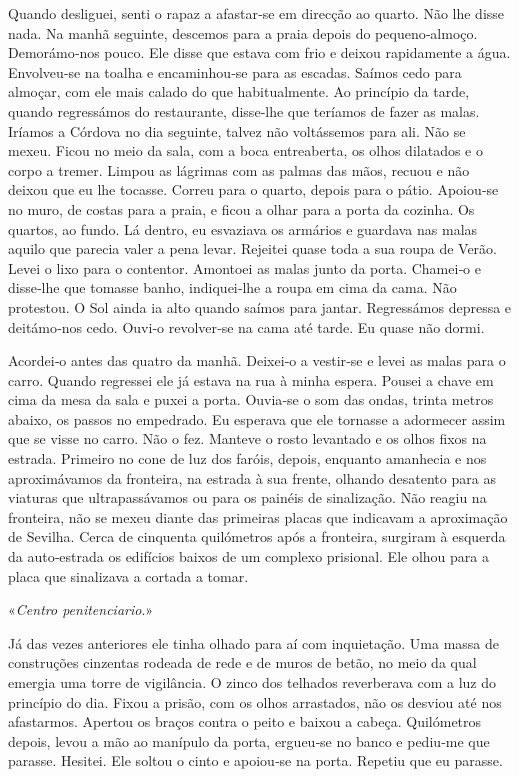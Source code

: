 Quando desliguei, senti o rapaz a afastar­‑se em direcção ao quarto. Não
lhe disse nada. Na manhã seguinte, descemos para a praia depois do
pequeno­‑almoço. Demorámo­‑nos pouco. Ele disse que estava com frio e
deixou rapidamente a água. Envolveu­‑se na toalha e encaminhou­‑se para
as escadas. Saímos cedo para almoçar, com ele mais calado do que
habitualmente. Ao princípio da tarde, quando regressámos do restaurante,
disse­‑lhe que teríamos de fazer as malas. Iríamos a Córdova no dia
seguinte, talvez não voltássemos para ali. Não se mexeu. Ficou no meio
da sala, com a boca entreaberta, os olhos dilatados e o corpo a tremer.
Limpou as lágrimas com as palmas das mãos, recuou e não deixou que eu
lhe tocasse. Correu para o quarto, depois para o pátio. Apoiou­‑se no
muro, de costas para a praia, e ficou a olhar para a porta da cozinha.
Os quartos, ao fundo. Lá dentro, eu esvaziava os armários e guardava nas
malas aquilo que parecia valer a pena levar. Rejeitei quase toda a sua
roupa de Verão. Levei o lixo para o contentor. Amontoei as malas junto
da porta. Chamei­‑o e disse­‑lhe que tomasse banho, indiquei­‑lhe a
roupa em cima da cama. Não protestou. O Sol ainda ia alto quando saímos
para jantar. Regressámos depressa e deitámo­‑nos cedo. Ouvi­‑o
revolver­‑se na cama até tarde. Eu quase não dormi.

Acordei­‑o antes das quatro da manhã. Deixei­‑o a vestir­‑se e levei as
malas para o carro. Quando regressei ele já estava na rua à minha
espera. Pousei a chave em cima da mesa da sala e puxei a porta.
Ouvia­‑se o som das ondas, trinta metros abaixo, os passos no empedrado.
Eu esperava que ele tornasse a adormecer assim que se visse no carro.
Não o fez. Manteve o rosto levantado e os olhos fixos na estrada.
Primeiro no cone de luz dos faróis, depois, enquanto amanhecia e nos
aproximávamos da fronteira, na estrada à sua frente, olhando desatento
para as viaturas que ultrapassávamos ou para os painéis de sinalização.
Não reagiu na fronteira, não se mexeu diante das primeiras placas que
indicavam a aproximação de Sevilha. Cerca de cinquenta quilómetros após
a fronteira, surgiram à esquerda da auto­‑estrada os edifícios baixos de
um complexo prisional. Ele olhou para a placa que sinalizava a cortada a
tomar.

«\emph{Centro penitenciario}.»

Já das vezes anteriores ele tinha olhado para aí com inquietação. Uma
massa de construções cinzentas rodeada de rede e de muros de betão, no
meio da qual emergia uma torre de vigilância. O zinco dos telhados
reverberava com a luz do princípio do dia. Fixou a prisão, com os olhos
arrastados, não os desviou até nos afastarmos. Apertou os braços contra
o peito e baixou a cabeça. Quilómetros depois, levou a mão ao manípulo
da porta, ergueu­‑se no banco e pediu­‑me que parasse. Hesitei. Ele
soltou o cinto e apoiou­‑se na porta. Repetiu que eu parasse.

